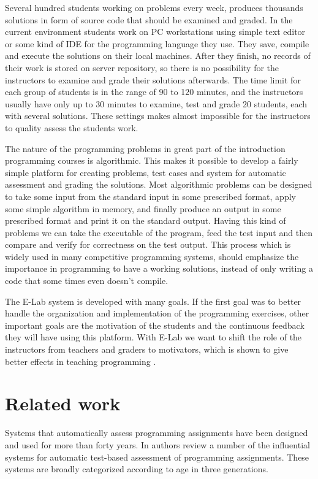 \documentclass{article}
\begin{document}
Several hundred students working on problems every week, produces thousands
solutions in form of source code that should be examined and graded. In the
current environment students work on PC workstations using simple text
editor or some kind of IDE for the programming language they use. They save,
compile and execute the solutions on their local machines. After they finish, no
records of their work is stored on server repository, so there is no
possibility for the instructors to examine and grade their solutions afterwards.
The time limit for each group of students is in the range of 90 to 120 minutes,
and the instructors usually have only up to 30 minutes to examine, test and
grade 20 students, each with several solutions. These settings makes almost
impossible for the instructors to quality assess the students work.

The nature of the programming problems in great part of the introduction
programming courses is algorithmic. This makes it possible to develop a fairly
simple platform for creating problems, test cases and system for automatic
assessment and grading the solutions. Most algorithmic problems can be
designed to take some input from the standard input in some prescribed format,
apply some simple algorithm in memory, and finally produce an output in some
prescribed format and print it on the standard output. Having this kind of
problems we can take the executable of the program, feed the test input and then
compare and verify for correctness on the test output. This process which is
widely used in many competitive programming systems, should emphasize the
importance in programming to have a working solutions, instead of only writing a
code that some times even doesn't compile.

The E-Lab system is developed with many goals. If the first goal was to better
handle the organization and implementation of the programming exercises, other
important goals are the motivation of the students and the continuous feedback
they will have using this platform. With E-Lab we want to shift the role of the
instructors from teachers and graders to motivators, which is shown to give
better effects in teaching programming \cite{jenkins2001teaching}.

\section{Related work}

Systems that automatically assess programming assignments have been designed and
used for more than forty years. In \cite{douce2005automatic} authors review
a number of the influential systems for automatic test-based assessment
of programming assignments. These systems are broadly categorized according to
age in three generations. 
\end{document}
